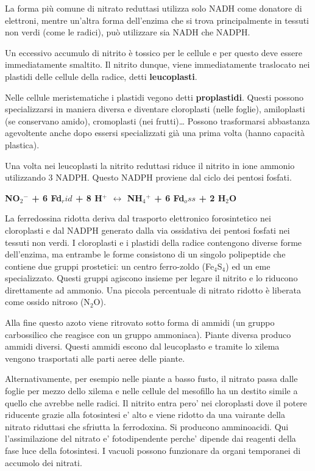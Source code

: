 \documentclass[]{article}
\begin{document}
La forma più comune di nitrato reduttasi utilizza solo NADH come
donatore di elettroni, mentre un'altra forma dell'enzima che si trova
principalmente in tessuti non verdi (come le radici), può utilizzare sia
NADH che NADPH.

Un eccessivo accumulo di nitrito è tossico per le cellule e per questo
deve essere immediatamente smaltito. Il nitrito dunque, viene
immediatamente traslocato nei plastidi delle cellule della radice, detti
\textbf{leucoplasti}.

Nelle cellule meristematiche i plastidi vegono detti
\textbf{proplastidi}. Questi possono specializzarsi in maniera diversa e
diventare cloroplasti (nelle foglie), amiloplasti (se conservano amido),
cromoplasti (nei frutti)\ldots{} Possono trasformarsi abbastanza
agevoltente anche dopo essersi specializzati già una prima volta (hanno
capacità plastica).

Una volta nei leucoplasti la nitrito reduttasi riduce il nitrito in ione
ammonio utilizzando 3 NADPH. Questo NADPH proviene dal ciclo dei pentosi
fosfati.

\textbf{NO$_2$$^-$ + 6 Fd$_rid$ + 8 H$^+$ $\longleftrightarrow$
NH$_4$$^+$ + 6 Fd$_oss$ + 2 H$_2$O}

La ferredossina ridotta deriva dal trasporto elettronico forosintetico
nei cloroplasti e dal NADPH generato dalla via ossidativa dei pentosi
fosfati nei tessuti non verdi. I cloroplasti e i plastidi della radice
contengono diverse forme dell'enzima, ma entrambe le forme consistono di
un singolo polipeptide che contiene due gruppi prostetici: un centro
ferro-zoldo (Fe$_4$S$_4$) ed un eme specializzato. Questi gruppi
agiscono insieme per legare il nitrito e lo riducono direttamente ad
ammonio. Una piccola percentuale di nitrato ridotto è liberata come
ossido nitroso (N$_2$O).

Alla fine questo azoto viene ritrovato sotto forma di ammidi (un gruppo
carbossilico che reagisce con un gruppo ammoniaca). Piante diversa
produco ammidi diversi. Questi ammidi escono dal leucoplasto e tramite
lo xilema vengono trasportati alle parti aeree delle piante.

Alternativamente, per esempio nelle piante a basso fusto, il nitrato
passa dalle foglie per mezzo dello xilema e nelle cellule del mesofillo
ha un destito simile a quello che avrebbe nelle radici. Il nitrito entra
pero' nei cloroplasti dove il potere riducente grazie alla fotosintesi
e' alto e viene ridotto da una vairante della nitrato riduttasi che
sfriutta la ferrodoxina. Si producono amminoacidi. Qui l'assimilazione
del nitrato e' fotodipendente perche' dipende dai reagenti della fase
luce della fotosintesi. I vacuoli possono funzionare da organi
temporanei di accumolo dei nitrati.
\end{document}
